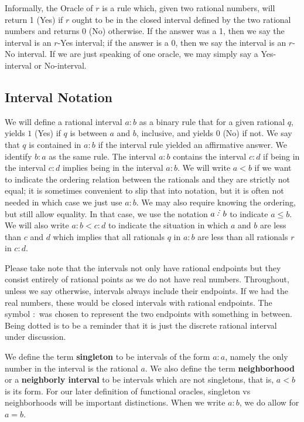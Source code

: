 \documentclass[12pt]{article}
\begin{document}
Informally, the Oracle of $r$ is a rule which, given two rational numbers, will return 1 (Yes) if $r$ ought to be in the closed interval defined by the two rational numbers and returns 0 (No) otherwise. If the answer was a 1, then we say the interval is an $r$-Yes interval; if the answer is a 0, then we say the interval is an $r$-No interval.  If we are just speaking of one oracle, we may simply say a Yes-interval or No-interval. 

\subsection{Interval Notation}

We will define a rational interval $a:b$ as a binary rule that for a given rational $q$, yields $1$ (Yes) if $q$ is between $a$ and $b$, inclusive, and yields $0$ (No) if not. We say that $q$ is contained in $a:b$ if the interval rule yielded an affirmative answer.  We identify $b:a$ as the same rule. The interval $a:b$ contains the interval $c:d$ if being in the interval $c:d$ implies being in the interval $a:b$. We will write $a\lt b$ if we want to indicate the ordering relation between the rationals and they are strictly not equal; it is sometimes convenient to slip that into notation, but it is often not needed in which case we just use $a:b$. We may also require knowing the ordering, but still allow equality. In that case, we use the notation $a \lte b$ to indicate $a \leq b$.  We will also write $a:b < c:d$ to indicate the situation in which $a$ and $b$ are less than $c$ and $d$ which implies that all rationals $q$ in $a:b$ are less than all rationals $r$ in $c:d$.


Please take note that the intervals not only have rational endpoints but they consist entirely of rational points as we do not have real numbers. Throughout, unless we say otherwise, intervals always include their endpoints. If we had the real numbers, these would be closed intervals with rational endpoints.  The symbol $:$ was chosen to represent the two endpoints with something in between. Being dotted is to be a reminder that it is just the discrete rational interval under discussion. 

We define the term \textbf{singleton} to be intervals of the form $a:a$, namely the only number in the interval is the rational $a$. We also define the term \textbf{neighborhood} or a \textbf{neighborly interval} to be intervals which are not singletons, that is, $a \lt b$ is its form. For our later definition of functional oracles, singleton vs neighborhoods will be important distinctions. When we write $a:b$, we do allow for $a=b$.
\end{document}
